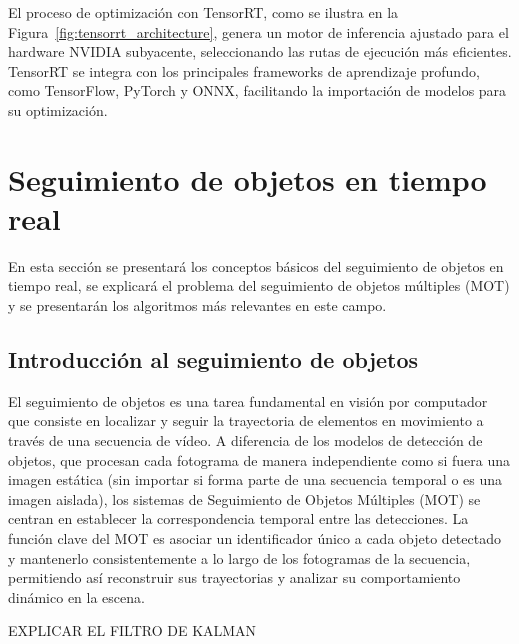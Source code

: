 \documentclass[11pt,spanish,listoffigures,listoftables]{tfgetsinf}
\begin{document}
El proceso de optimización con TensorRT, como se ilustra en la Figura~\ref{fig:tensorrt_architecture}, genera un motor de inferencia ajustado para el hardware NVIDIA subyacente, seleccionando las rutas de ejecución más eficientes. TensorRT se integra con los principales frameworks de aprendizaje profundo, como TensorFlow, PyTorch y ONNX, facilitando la importación de modelos para su optimización.



\section{Seguimiento de objetos en tiempo real}
En esta sección se presentará los conceptos básicos del seguimiento de objetos en tiempo real, se explicará el problema del seguimiento de objetos múltiples (MOT) y se presentarán los algoritmos más relevantes en este campo.

\subsection{Introducción al seguimiento de objetos}
El seguimiento de objetos es una tarea fundamental en visión por computador que consiste en localizar y seguir la trayectoria de elementos en movimiento a través de una secuencia de vídeo. A diferencia de los modelos de detección de objetos, que procesan cada fotograma de manera independiente como si fuera una imagen estática (sin importar si forma parte de una secuencia temporal o es una imagen aislada), los sistemas de Seguimiento de Objetos Múltiples (MOT) se centran en establecer la correspondencia temporal entre las detecciones. La función clave del MOT es asociar un identificador único a cada objeto detectado y mantenerlo consistentemente a lo largo de los fotogramas de la secuencia, permitiendo así reconstruir sus trayectorias y analizar su comportamiento dinámico en la escena.


EXPLICAR EL FILTRO DE KALMAN
\end{document}
